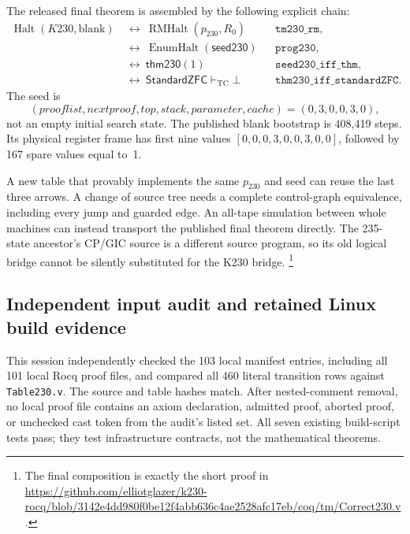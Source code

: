 The released final theorem is assembled by the following explicit chain:
\begin{align*}
 \operatorname{Halt}(K230,\mathrm{blank})
 &\ \longleftrightarrow\ \operatorname{RMHalt}(p_{230},R_0)
                      &&\texttt{tm230\_rm},\\
 &\ \longleftrightarrow\ \operatorname{EnumHalt}(\mathsf{seed230})
                      &&\texttt{prog230},\\
 &\ \longleftrightarrow\ \mathsf{thm230}(1)
                      &&\texttt{seed230\_iff\_thm},\\
 &\ \longleftrightarrow\ \mathsf{StandardZFC}\vdash_{\mathrm{TC}}\bot
                      &&\texttt{thm230\_iff\_standardZFC}.
\end{align*}
The seed is
\[
  (\mathit{prooflist},\mathit{nextproof},\mathit{top},\mathit{stack},
     \mathit{parameter},\mathit{cache})=(0,3,0,0,3,0),
\]
not an empty initial search state.  The published blank bootstrap is
408,419 steps.  Its physical register frame has first nine values
$[0,0,0,3,0,0,3,0,0]$, followed by 167 spare values equal to~1.

A new table that provably implements the same $p_{230}$ and seed can
reuse the last three arrows.  A change of source tree needs a complete
control-graph equivalence, including every jump and guarded edge.
An all-tape simulation between whole machines can instead transport the
published final theorem directly.  The 235-state ancestor's CP/GIC
source is a different source program, so its old logical bridge cannot
be silently substituted for the K230 bridge.
\footnote{The final composition is exactly the short proof in
\url{https://github.com/elliotglazer/k230-rocq/blob/3142e4dd980f0be12f4abb636c4ae2528afc17eb/coq/tm/Correct230.v}.}

\subsection{Independent input audit and retained Linux build evidence}

This session independently checked the 103 local manifest entries,
including all 101 local Rocq proof files, and compared all 460 literal
transition rows against \texttt{Table230.v}.  The source and table
hashes match.  After nested-comment removal, no local proof file
contains an axiom declaration, admitted proof, aborted proof, or unchecked
cast token from the audit's listed set.  All seven existing build-script
tests pass; they test infrastructure contracts, not the mathematical
theorems.

